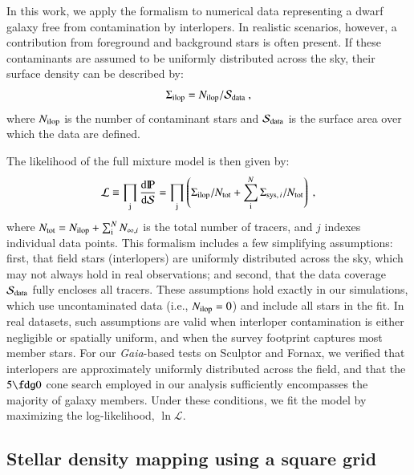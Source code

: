 \documentclass[fleqn,usenatbib]{mnras}
\newcommand{\gaia}{{\sl Gaia}}
\newcommand{\probP}{\text{I\kern-0.15em P}}
\newcommand{\diff}{{\rm d}}
\begin{document}
In this work, we apply the formalism to numerical data representing a dwarf galaxy free from contamination by interlopers. In realistic scenarios, however, a contribution from foreground and background stars is often present. If these contaminants are assumed to be uniformly distributed across the sky, their surface density can be described by:
\begin{equation}
    \Sigma_{\rm ilop} = N_{\rm ilop} / \mathcal{S}_{\rm data} \ ,
\end{equation}
%
where $N_{\rm ilop}$ is the number of contaminant stars and $\mathcal{S}_{\rm data}$ is the surface area over which the data are defined.

The likelihood of the full mixture model is then given by:
\begin{equation}
    \mathcal{L} \equiv \prod_{\rm j} \frac{{\diff \probP} }{\diff \mathcal{S}} = \prod_{\rm j} \left( \Sigma_{\rm ilop} / N_{\rm tot} + \sum_{\rm i}^{N} \Sigma_{\mathrm{sys}, \, i} / N_{\rm tot} \right) \ ,
\end{equation}
%
where $N_{\rm tot} = N_{\rm ilop} + \sum_{\rm i}^{N} N_{\infty, i}$ is the total number of tracers, and $j$ indexes individual data points. This formalism includes a few simplifying assumptions: first, that field stars (interlopers) are uniformly distributed across the sky, which may not always hold in real observations; and second, that the data coverage $\mathcal{S}_{\rm data}$ fully encloses all tracers.
These assumptions hold exactly in our simulations, which use uncontaminated data (i.e., $N_{\rm ilop} = 0$) and include all stars in the fit. In real datasets, such assumptions are valid when interloper contamination is either negligible or spatially uniform, and when the survey footprint captures most member stars. For our \gaia-based tests on Sculptor and Fornax, we verified that interlopers are approximately uniformly distributed across the field, and that the $5\fdg0$ cone search employed in our analysis sufficiently encompasses the majority of galaxy members. Under these conditions, we fit the model by maximizing the log-likelihood, $\ln \mathcal{L}$.

\subsection{Stellar density mapping using a square grid}    \label{app: count-cell}
\end{document}
